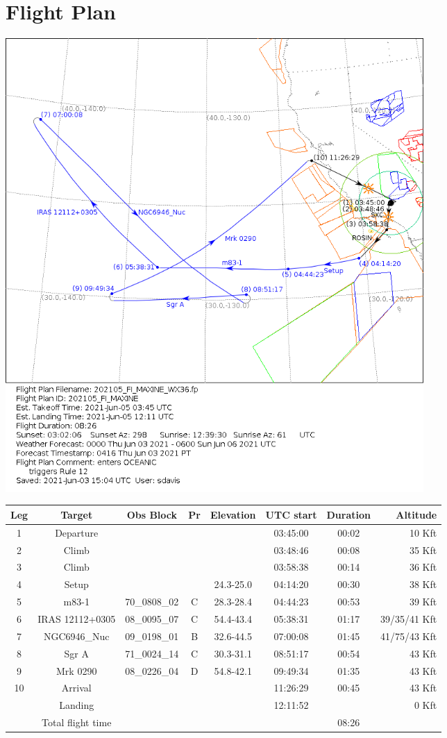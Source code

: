 \documentclass[10pt]{article}
\begin{document}
\section{Flight Plan}
\begin{center}
\includegraphics[width=0.70\textwidth]{../test/202105_FI_MAXINE_WX36.png}
\end{center}
\begin{table}[h]
\begin{center}
\begin{tabular}{cccccccr}
\hline
\hline
Leg & Target & Obs Block & Pr & Elevation & UTC start & Duration & Altitude\\
\hline
\hline
1  & Departure &  &  &  & 03:45:00 & 00:02 & 10 Kft\\
2  & Climb &  &  &  & 03:48:46 & 00:08 & 35 Kft\\
3  & Climb &  &  &  & 03:58:38 & 00:14 & 36 Kft\\
4  & Setup &  &  & 24.3-25.0 & 04:14:20 & 00:30 & 38 Kft\\
5  & m83-1 & 70\_0808\_02 & C & 28.3-28.4 & 04:44:23 & 00:53 & 39 Kft\\
6  & IRAS 12112+0305 & 08\_0095\_07 & C & 54.4-43.4 & 05:38:31 & 01:17 & 39/35/41 Kft\\
7  & NGC6946\_Nuc & 09\_0198\_01 & B & 32.6-44.5 & 07:00:08 & 01:45 & 41/75/43 Kft\\
8  & Sgr A & 71\_0024\_14 & C & 30.3-31.1 & 08:51:17 & 00:54 & 43 Kft\\
9  & Mrk 0290 & 08\_0226\_04 & D & 54.8-42.1 & 09:49:34 & 01:35 & 43 Kft\\
10 & Arrival &  &  &  & 11:26:29 & 00:45 & 43 Kft\\
   & Landing &   &  &   & 12:11:52 &   & 0 Kft\\
   & Total flight time &   &  &   &  & 08:26 & \\
\hline
\hline
\end{tabular}
\end{center}
\end{table}
\end{document}
